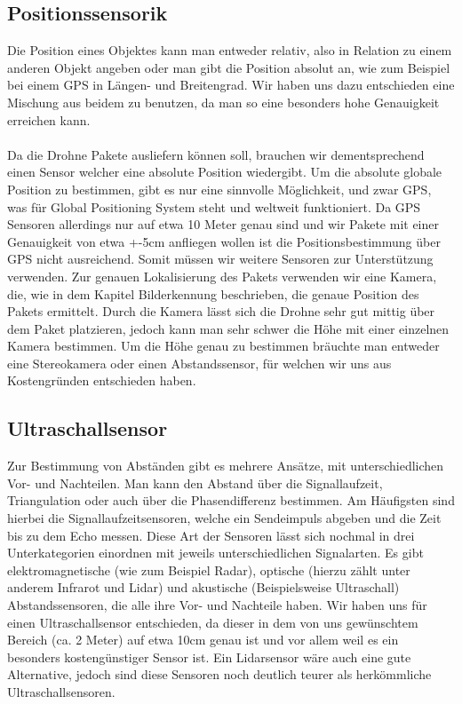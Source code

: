 \subsection{Positionssensorik}
Die Position eines Objektes kann man entweder relativ, also in Relation zu einem anderen Objekt angeben oder man gibt die Position absolut an, wie zum Beispiel bei einem GPS in Längen- und Breitengrad. Wir haben uns dazu entschieden eine Mischung aus beidem zu benutzen, da man so eine besonders hohe Genauigkeit erreichen kann.
\\
\\ Da die Drohne Pakete ausliefern können soll, brauchen wir dementsprechend einen Sensor welcher eine absolute Position wiedergibt. Um die absolute globale Position zu bestimmen, gibt es nur eine sinnvolle Möglichkeit, und zwar GPS, was für Global Positioning System steht und weltweit funktioniert. Da GPS Sensoren allerdings nur auf etwa 10 Meter genau sind und wir Pakete mit einer Genauigkeit von etwa +-5cm anfliegen wollen ist die Positionsbestimmung über GPS nicht ausreichend. Somit müssen wir weitere Sensoren zur Unterstützung verwenden. Zur genauen Lokalisierung des Pakets verwenden wir eine Kamera, die, wie in dem Kapitel Bilderkennung beschrieben, die genaue Position des Pakets ermittelt. Durch die Kamera lässt sich die Drohne sehr gut mittig über dem Paket platzieren, jedoch kann man sehr schwer die Höhe mit einer einzelnen Kamera bestimmen. Um die Höhe genau zu bestimmen bräuchte man entweder eine Stereokamera oder einen Abstandssensor, für welchen wir uns aus Kostengründen entschieden haben.

\subsection{Ultraschallsensor}
Zur Bestimmung von Abständen gibt es mehrere Ansätze, mit unterschiedlichen Vor- und Nachteilen. Man kann den Abstand über die Signallaufzeit, Triangulation oder auch über die Phasendifferenz bestimmen. Am Häufigsten sind hierbei die Signallaufzeitsensoren, welche ein Sendeimpuls abgeben und die Zeit bis zu dem Echo messen. Diese Art der Sensoren lässt sich nochmal in drei Unterkategorien einordnen mit jeweils unterschiedlichen Signalarten. Es gibt elektromagnetische (wie zum Beispiel Radar), optische (hierzu zählt unter anderem Infrarot und Lidar) und akustische (Beispielsweise Ultraschall) Abstandssensoren, die alle ihre Vor- und Nachteile haben. Wir haben uns für einen Ultraschallsensor entschieden, da dieser in dem von uns gewünschtem Bereich (ca. 2 Meter) auf etwa 10cm genau ist und vor allem weil es ein besonders kostengünstiger Sensor ist. Ein Lidarsensor wäre auch eine gute Alternative, jedoch sind diese Sensoren noch deutlich teurer als herkömmliche Ultraschallsensoren.

